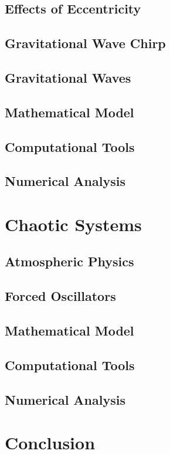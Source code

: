 \documentclass{report}
\begin{document}
    \subsection{Effects of Eccentricity}

    \subsection{Gravitational Wave Chirp}

    \subsection{Gravitational Waves}






    \subsection{Mathematical Model}

    \subsection{Computational Tools}

    \subsection{Numerical Analysis}

\section{Chaotic Systems}

    \subsection{Atmospheric Physics}

    \subsection{Forced Oscillators}

    \subsection{Mathematical Model}

    \subsection{Computational Tools}

    \subsection{Numerical Analysis}

\section{Conclusion}

\newpage

\printbibliography
\end{document}
